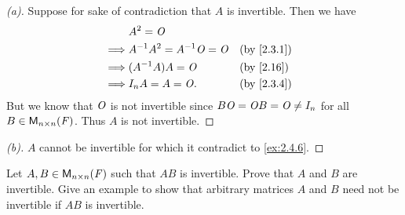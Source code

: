 \begin{proof}[(a)]
  Suppose for sake of contradiction that \(A\) is invertible.
  Then we have
  \begin{align*}
             & A^2 = \zm                                                   \\
    \implies & A^{-1} A^2 = A^{-1} \zm = \zm &  & \text{(by \cref{2.3.1})} \\
    \implies & (A^{-1} A) A = \zm            &  & \text{(by \cref{2.16})}  \\
    \implies & I_n A = A = \zm.              &  & \text{(by \cref{2.3.4})}
  \end{align*}
  But we know that \(\mathit{O}\) is not invertible since \(B \mathit{O} = \mathit{O} B = \mathit{O} \neq I_n\) for all \(B \in \mathsf{M}_{{n} \times n}({\mathit{F}})\).
  Thus \(A\) is not invertible.
\end{proof}

\begin{proof}[(b)]
  \(A\) cannot be invertible for which it contradict to \cref{ex:2.4.6}.
\end{proof}

\setcounter{ex}{8}
\begin{ex}\label{ex:2.4.9}
  Let \(A, B \in \mathsf{M}_{{n} \times n}({\mathit{F}})\) such that \(AB\) is invertible.
  Prove that \(A\) and \(B\) are invertible.
  Give an example to show that arbitrary matrices \(A\) and \(B\) need not be invertible if \(AB\) is invertible.
\end{ex}

